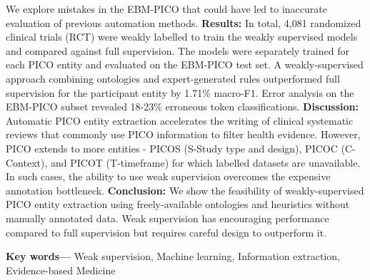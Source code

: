 \documentclass[10.7pt,]{article}
\providecommand{\keywords}[1]
{
  \small	
  \textbf{Key words---} #1
}
\begin{document}
We explore mistakes in the EBM-PICO that could have led to inaccurate evaluation of previous automation methods.
\textbf{Results:}
In total, 4,081 randomized clinical trials (RCT) were weakly labelled to train the weakly supervised models and compared against full supervision.
The models were separately trained for each PICO entity and evaluated on the EBM-PICO test set.
A weakly-supervised approach combining ontologies and expert-generated rules outperformed full supervision for the participant entity by 1.71\% macro-F1.
Error analysis on the EBM-PICO subset revealed 18-23\% erroneous token classifications.
\textbf{Discussion:}
Automatic PICO entity extraction accelerates the writing of clinical systematic reviews that commonly use PICO information to filter health evidence.
However, PICO extends to more entities - PICOS (S-Study type and design), PICOC (C-Context), and PICOT (T-timeframe) for which labelled datasets are unavailable.
In such cases, the ability to use weak supervision overcomes the expensive annotation bottleneck.
\textbf{Conclusion:}
We show the feasibility of weakly-supervised PICO entity extraction using freely-available ontologies and heuristics without manually annotated data. Weak supervision has encouraging performance compared to full supervision but requires careful design to outperform it. 


\keywords{Weak supervision, Machine learning, Information extraction, Evidence-based Medicine}


%
\clearpage
%
\end{document}
